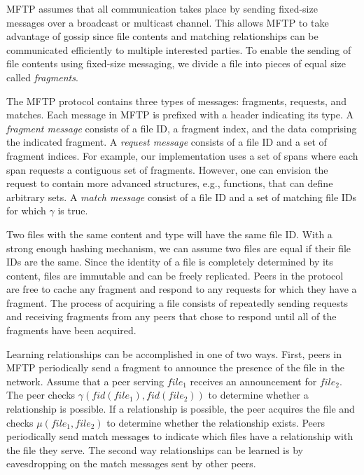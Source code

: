 \documentclass[letterpaper]{article}
\begin{document}
MFTP assumes that all communication takes place by sending fixed-size messages over a broadcast or multicast channel.
This allows MFTP to take advantage of gossip since file contents and matching relationships can be communicated efficiently to multiple interested parties.
To enable the sending of file contents using fixed-size messaging, we divide a file into pieces of equal size called \emph{fragments}.

The MFTP protocol contains three types of messages: fragments, requests, and matches.
Each message in MFTP is prefixed with a header indicating its type.
A \emph{fragment message} consists of a file ID, a fragment index, and the data comprising the indicated fragment.
A \emph{request message} consists of a file ID and a set of fragment indices.
For example, our implementation uses a set of spans where each span requests a contiguous set of fragments.
However, one can envision the request to contain more advanced structures, e.g., functions, that can define arbitrary sets.
A \emph{match message} consist of a file ID and a set of matching file IDs for which $\gamma$ is true.

Two files with the same content and type will have the same file ID.
With a strong enough hashing mechanism, we can assume two files are equal if their file IDs are the same.
Since the identity of a file is completely determined by its content, files are immutable and can be freely replicated.
Peers in the protocol are free to cache any fragment and respond to any requests for which they have a fragment.
The process of acquiring a file consists of repeatedly sending requests and receiving fragments from any peers that chose to respond until all of the fragments have been acquired.

Learning relationships can be accomplished in one of two ways.
First, peers in MFTP periodically send a fragment to announce the presence of the file in the network.
Assume that a peer serving $file_1$ receives an announcement for $file_2$.
The peer checks $\gamma(fid(file_1), fid(file_2))$ to determine whether a relationship is possible.
If a relationship is possible, the peer acquires the file and checks $\mu(file_1, file_2)$ to determine whether the relationship exists.
Peers periodically send match messages to indicate which files have a relationship with the file they serve.
The second way relationships can be learned is by eavesdropping on the match messages sent by other peers.

\end{document}
